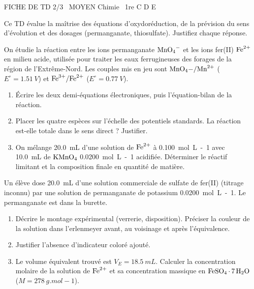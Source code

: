 \documentclass[11pt]{article}
\begin{document}
\begin{tcolorbox}[enhanced,colback=popink,colframe=popink,arc=10pt,boxrule=0pt,left=12pt,right=12pt,top=9pt,bottom=9pt]
{\color{white}\popxbold\small FICHE DE TD 2/3 \textbullet\ MOYEN \hfill Chimie \textbullet\ 1re C D E\par}
\end{tcolorbox}
\vspace{4pt}
Ce TD évalue la maîtrise des équations d'oxydoréduction, de la prévision du sens d'évolution et des dosages (permanganate, thiosulfate). Justifiez chaque réponse.

\begin{exercice}
On étudie la réaction entre les ions permanganate $\ce{MnO4-}$ et les ions fer(II) $\ce{Fe^{2+}}$ en milieu acide, utilisée pour traiter les eaux ferrugineuses des forages de la région de l'Extrême-Nord.
Les couples mis en jeu sont $\ce{MnO4-/Mn^{2+}}$ ($E^\circ = \SI{1.51}{V}$) et $\ce{Fe^{3+}/Fe^{2+}}$ ($E^\circ = \SI{0.77}{V}$).
\begin{enumerate}
    \item Écrire les deux demi-équations électroniques, puis l'équation-bilan de la réaction.
    \item Placer les quatre espèces sur l'échelle des potentiels standards. La réaction est-elle totale dans le sens direct ? Justifier.
    \item On mélange \SI{20.0}{mL} d'une solution de $\ce{Fe^{2+}}$ à \SI{0.100}{mol.L-1} avec \SI{10.0}{mL} de $\ce{KMnO4}$ \SI{0.0200}{mol.L-1} acidifiée. Déterminer le réactif limitant et la composition finale en quantité de matière.
\end{enumerate}
\end{exercice}

\begin{exercice}
Un élève dose \SI{20.0}{mL} d'une solution commerciale de sulfate de fer(II) (titrage inconnu) par une solution de permanganate de potassium \SI{0.0200}{mol.L-1}. Le permanganate est dans la burette.
\begin{enumerate}
    \item Décrire le montage expérimental (verrerie, disposition). Préciser la couleur de la solution dans l'erlenmeyer avant, au voisinage et après l'équivalence.
    \item Justifier l'absence d'indicateur coloré ajouté.
    \item Le volume équivalent trouvé est $V_E = \SI{18.5}{mL}$. Calculer la concentration molaire de la solution de $\ce{Fe^{2+}}$ et sa concentration massique en $\ce{FeSO4.7H2O}$ ($M = \SI{278}{g.mol-1}$).
\end{enumerate}
\end{exercice}
\end{document}
